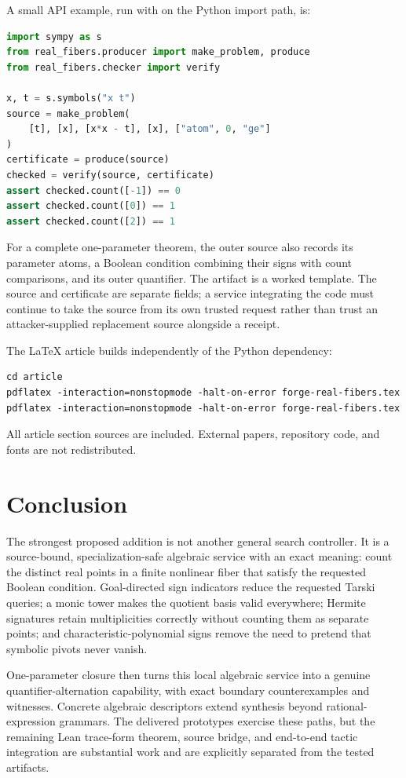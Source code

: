 A small API example, run with  on the Python import path, is:
\begin{lstlisting}[language=Python]
import sympy as s
from real_fibers.producer import make_problem, produce
from real_fibers.checker import verify

x, t = s.symbols("x t")
source = make_problem(
    [t], [x], [x*x - t], [x], ["atom", 0, "ge"]
)
certificate = produce(source)
checked = verify(source, certificate)
assert checked.count([-1]) == 0
assert checked.count([0]) == 1
assert checked.count([2]) == 1
\end{lstlisting}
For a complete one-parameter theorem, the outer source also records its parameter atoms, a Boolean condition combining their signs with count comparisons, and its outer quantifier. The artifact  is a worked template. The source and certificate are separate fields; a service integrating the code must continue to take the source from its own trusted request rather than trust an attacker-supplied replacement source alongside a receipt.

The LaTeX article builds independently of the Python dependency:
\begin{lstlisting}
cd article
pdflatex -interaction=nonstopmode -halt-on-error forge-real-fibers.tex
pdflatex -interaction=nonstopmode -halt-on-error forge-real-fibers.tex
\end{lstlisting}
All article section sources are included. External papers, repository code, and fonts are not redistributed.

\section{Conclusion}

The strongest proposed addition is not another general search controller. It is a source-bound, specialization-safe algebraic service with an exact meaning: count the distinct real points in a finite nonlinear fiber that satisfy the requested Boolean condition. Goal-directed sign indicators reduce the requested Tarski queries; a monic tower makes the quotient basis valid everywhere; Hermite signatures retain multiplicities correctly without counting them as separate points; and characteristic-polynomial signs remove the need to pretend that symbolic pivots never vanish.

One-parameter closure then turns this local algebraic service into a genuine quantifier-alternation capability, with exact boundary counterexamples and witnesses. Concrete algebraic descriptors extend synthesis beyond rational-expression grammars. The delivered prototypes exercise these paths, but the remaining Lean trace-form theorem, source bridge, and end-to-end tactic integration are substantial work and are explicitly separated from the tested artifacts.

